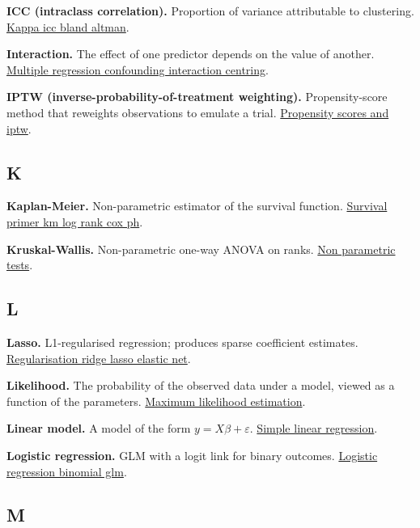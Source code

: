 \documentclass[
]{article}
\begin{document}
\textbf{ICC (intraclass correlation).} Proportion of variance
attributable to clustering.
\href{../chapters/14-clinical/labs/lab-kappa-icc-bland-altman.Rmd}{Kappa
icc bland altman}.

\textbf{Interaction.} The effect of one predictor depends on the value
of another.
\href{../chapters/07-regression/labs/lab-multiple-regression-confounding-interaction-centring.Rmd}{Multiple
regression confounding interaction centring}.

\textbf{IPTW (inverse-probability-of-treatment weighting).}
Propensity-score method that reweights observations to emulate a trial.
\href{../chapters/16-design/labs/lab-propensity-scores-and-iptw.Rmd}{Propensity
scores and iptw}.

\subsection{K}\label{k}

\textbf{Kaplan-Meier.} Non-parametric estimator of the survival
function.
\href{../chapters/11-survival/labs/lab-survival-primer-km-log-rank-cox-ph.Rmd}{Survival
primer km log rank cox ph}.

\textbf{Kruskal-Wallis.} Non-parametric one-way ANOVA on ranks.
\href{../chapters/04-inferential/labs/lab-non-parametric-tests.Rmd}{Non
parametric tests}.

\subsection{L}\label{l}

\textbf{Lasso.} L1-regularised regression; produces sparse coefficient
estimates.
\href{../chapters/13-ml/labs/lab-regularisation-ridge-lasso-elastic-net.Rmd}{Regularisation
ridge lasso elastic net}.

\textbf{Likelihood.} The probability of the observed data under a model,
viewed as a function of the parameters.
\href{../chapters/04-inferential/labs/lab-maximum-likelihood-estimation.Rmd}{Maximum
likelihood estimation}.

\textbf{Linear model.} A model of the form \(y = X\beta + \varepsilon\).
\href{../chapters/07-regression/labs/lab-simple-linear-regression.Rmd}{Simple
linear regression}.

\textbf{Logistic regression.} GLM with a logit link for binary outcomes.
\href{../chapters/07-regression/labs/lab-logistic-regression-binomial-glm.Rmd}{Logistic
regression binomial glm}.

\subsection{M}\label{m}
\end{document}
